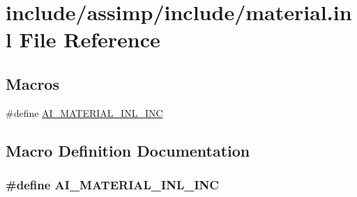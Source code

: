\hypertarget{material_8inl}{\section{include/assimp/include/material.inl File Reference}
\label{material_8inl}
}
\subsection*{Macros}
\begin{DoxyCompactItemize}
\item 
\#define \hyperlink{material_8inl_a49569a1f424aa8e1c0a0a1b991748fbc}{A\-I\-\_\-\-M\-A\-T\-E\-R\-I\-A\-L\-\_\-\-I\-N\-L\-\_\-\-I\-N\-C}
\end{DoxyCompactItemize}


\subsection{Macro Definition Documentation}
\hypertarget{material_8inl_a49569a1f424aa8e1c0a0a1b991748fbc}{
\subsubsection[{A\-I\-\_\-\-M\-A\-T\-E\-R\-I\-A\-L\-\_\-\-I\-N\-L\-\_\-\-I\-N\-C}]{\setlength{\rightskip}{0pt plus 5cm}\#define A\-I\-\_\-\-M\-A\-T\-E\-R\-I\-A\-L\-\_\-\-I\-N\-L\-\_\-\-I\-N\-C}}\label{material_8inl_a49569a1f424aa8e1c0a0a1b991748fbc}
